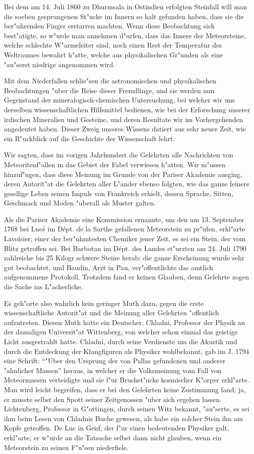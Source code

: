 \documentclass[a4paper, 11pt, oneside, german]{article}
\begin{document}
Bei dem am 14. Juli 1860 zu Dhurmsala in Ostindien erfolgten Steinfall will man die soeben gesprungenen St"ucke im Innern so kalt gefunden haben, dass sie die ber"uhrenden Finger erstarren machten. Wenn diese Beobachtung sich best"atigte, so w"urde man annehmen d"urfen, dass das Innere der Meteorsteine, welche schlechte W"armeleiter sind, noch einen Rest der Temperatur des Weltraumes bewahrt h"atte, welche aus physikalischen Gr"unden als eine "au"serst niedrige angenommen wird.

Mit dem Niederfallen schlie"sen die astronomischen und physikalischen Beobachtungen "uber die Reise dieser Fremdlinge, und sie werden nun Gegenstand der mineralogisch-chemischen Untersuchung, bei welcher wir uns derselben wissenschaftlichen Hilfsmittel bedienen, wie bei der Erforschung unserer irdischen Mineralien und Gesteine, und deren Resultate wir im Vorhergehenden angedeutet haben. Dieser Zweig unseres Wissens datiert aus sehr neuer Zeit, wie ein R"uckblick auf die Geschichte der Wissenschaft lehrt.

Wir sagten, dass im vorigen Jahrhundert die Gelehrten alle Nachrichten von Meteoritenf"allen in das Gebiet der Fabel verwiesen h"atten. Wir m"ussen hinzuf"ugen, dass diese Meinung im Grunde von der Pariser Akademie ausging, deren Autorit"at die Gelehrten aller L"ander ebenso folgten, wie das ganze feinere gesellige Leben seinen Impuls von Frankreich erhielt, dessen Sprache, Sitten, Geschmack und Moden "uberall als Muster galten.

Als die Pariser Akademie eine Kommission ernannte, um den am 13. September 1768 bei Lucé im Dépt. de la Sarthe gefallenen Meteorstein zu pr"ufen, erkl"arte Lavoisier, einer der ber"uhmtesten Chemiker jener Zeit, es sei ein Stein, der vom Blitz getroffen sei. Bei Barbotan im Dépt. des Landes st"urzten am 24. Juli 1790 zahlreiche bis 25 Kilogr schwere Steine herab; die ganze Erscheinung wurde sehr gut beobachtet, und Baudin, Arzt in Pau, ver"offentlichte das amtlich aufgenommene Protokoll. Trotzdem fand er keinen Glauben, denn Gelehrte zogen die Sache ins L"acherliche.

Es geh"orte also wahrlich kein geringer Muth dazu, gegen die erste wissenschaftliche Autorit"at und die Meinung aller Gelehrten "offentlich aufzutreten. Diesen Muth hatte ein Deutscher, Chladni, Professor der Physik an der damaligen Universit"at Wittenberg, von welcher schon einmal das geistige Licht ausgestrahlt hatte. Chladni, durch seine Verdienste um die Akustik und durch die Entdeckung der Klangfiguren als Physiker wohlbekannt, gab im J. 1794 eine Schrift: "`"Uber den Ursprung der von Pallas gefundenen und anderer "ahnlicher Massen"' heraus, in welcher er die Volksmeinung vom Fall von Meteormassen verteidigte und sie f"ur Bruchst"ucke kosmischer K"orper erkl"arte. Man wird leicht begreifen, dass er bei den Gelehrten keine Zustimmung fand; ja, er musste selbst den Spott seiner Zeitgenossen "uber sich ergehen lassen. Lichtenberg, Professor in G"ottingen, durch seinen Witz bekannt, "au"serte, es sei ihm beim Lesen von Chladnis Buche gewesen, als habe ein solcher Stein ihn am Kopfe getroffen. De Luc in Genf, der f"ur einen bedeutenden Physiker galt, erkl"arte, er w"urde an die Tatsache selbst dann nicht glauben, wenn ein Meteorstein zu seinen F"u"sen niederfiele.
\end{document}
